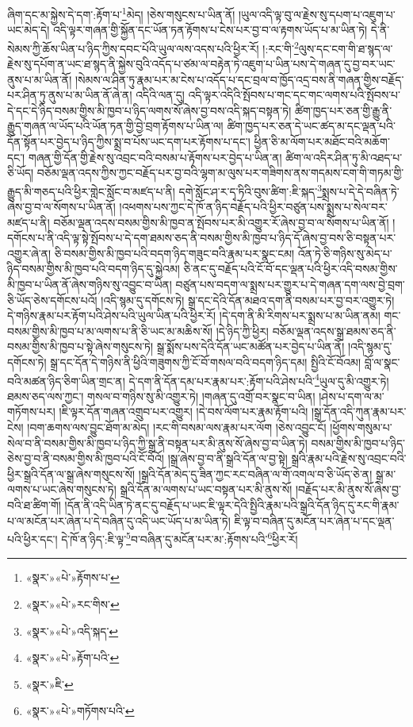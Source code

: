 ཞིག་དང་མ་སྐྱེས་དེ་དག་:རྟོག་པ་\footnote{«སྣར་»«པེ་»རྟོགས་པ་}མེད། །ཅེས་གསུངས་པ་ཡིན་ནོ། །ཡུལ་འདི་ལྟ་བུ་ལ་རྗེས་སུ་དཔག་པ་འཇུག་པ་ཡང་མེད་དེ། འདི་ལྟར་གཞན་གྱི་སྐྱོན་དང་ཡོན་ཏན་རྟོགས་པ་ངེས་པར་བྱ་བ་ལ་རྟགས་ཡོད་པ་མ་ཡིན་ཏེ། དེ་ནི་སེམས་ཀྱི་ཆོས་ཡིན་པ་ཉིད་ཀྱིས་དབང་པོའི་ཡུལ་ལས་འདས་པའི་ཕྱིར་རོ། །:རང་གི་\footnote{«སྣར་»«པེ་»རང་གིས་}ལུས་དང་ངག་གི་ཐ་སྙད་ལ་རྗེས་སུ་དཔོག་ན་ཡང་ཐ་སྙད་ནི་སྐྱེས་བུའི་འདོད་པ་ཙམ་ལ་བརྟེན་ཏེ་འཇུག་པ་ཡིན་པས་དེ་གཞན་དུ་བྱ་བར་ཡང་ནུས་པ་མ་ཡིན་ནོ། །སེམས་ལ་ཤིན་ཏུ་རྣམ་པར་མ་ངེས་པ་འདོད་པ་དང་བྲལ་བ་ཁྱོད་འདྲ་བས་ནི་གཞན་གྱིས་བརྗོད་པར་ཤིན་ཏུ་ནུས་པ་མ་ཡིན་ནོ་ཞེ་ན། འདིའི་ལན་དུ། འདི་ལྟར་འདིའི་སྤོབས་པ་གང་དང་གང་ལགས་པའི་སྤོབས་པ་དེ་དང་དེ་ཉིད་བསམ་གྱིས་མི་ཁྱབ་པ་ཉིད་ལགས་སོ་ཞེས་བྱ་བས་འདི་སྐད་བསྟན་ཏེ། ཚིག་ཁྱད་པར་ཅན་གྱི་རྒྱུ་ནི་རྒྱུད་གཞན་ལ་ཡོད་པའི་ཡོན་ཏན་གྱི་བྱེ་བྲག་རྟོགས་པ་ཡིན་ལ། ཚིག་ཁྱད་པར་ཅན་དེ་ཡང་ཚད་མ་དང་ལྡན་པའི་དོན་སྟོན་པར་བྱེད་པ་ཉིད་ཀྱིས་སྨྲ་བ་པོས་ཡང་དག་པར་རྟོགས་པ་དང་། ཕྱིན་ཅི་མ་ལོག་པར་མཐོང་བའི་མཆོག་དང་། གཞན་གྱི་དོན་གྱི་རྗེས་སུ་འབྲང་བའི་བསམ་པ་རྟོགས་པར་བྱེད་པ་ཡིན་ན། ཚིག་ལ་འདིར་ཤིན་ཏུ་མི་འཐད་པ་ཅི་ཡོད། བཅོམ་ལྡན་འདས་ཀྱིས་ཀྱང་བརྗོད་པར་བྱ་བའི་ལྷག་མ་ལུས་པར་གཟིགས་ནས་གདམས་ངག་གི་གཏམ་གྱི་རྒྱུད་མི་གཅད་པའི་ཕྱིར་གླེང་སློང་བ་མཛད་པ་ནི། དགེ་སློང་ཤ་ར་དྭ་ཏིའི་བུས་ཚིག་:ཇི་སྐད་\footnote{«སྣར་»«པེ་»འདི་སྐད་}སྨྲས་པ་དེ་དེ་བཞིན་ཏེ་ཞེས་བྱ་བ་ལ་སོགས་པ་ཡིན་ནོ། །འཕགས་པས་ཀྱང་དེ་ཁོ་ན་ཉིད་བརྗོད་པའི་ཕྱིར་བཙུན་པས་སྨྲས་པ་སེལ་བར་མཛད་པ་ནི། བཅོམ་ལྡན་འདས་བསམ་གྱིས་མི་ཁྱབ་ན་སྤོབས་པར་མི་འགྱུར་རོ་ཞེས་བྱ་བ་ལ་སོགས་པ་ཡིན་ནོ། །དགོངས་པ་ནི་འདི་ལྟ་སྟེ་སྤོབས་པ་དེ་དག་ཐམས་ཅད་ནི་བསམ་གྱིས་མི་ཁྱབ་པ་ཉིད་དོ་ཞེས་བྱ་བས་ཅི་བསྟན་པར་འགྱུར་ཞེ་ན། ཅི་བསམ་གྱིས་མི་ཁྱབ་པའི་བདག་ཉིད་གཟུང་བའི་རྣམ་པར་སྣང་ངམ། འོན་ཏེ་ཅི་གཉིས་སུ་མེད་པ་ཉིད་བསམ་གྱིས་མི་ཁྱབ་པའི་བདག་ཉིད་དུ་སྐྱེའམ། ཅི་ནང་དུ་བརྗོད་པའི་ངོ་བོ་དང་ལྡན་པའི་ཕྱིར་འདི་བསམ་གྱིས་མི་ཁྱབ་པ་ཡིན་ནོ་ཞེས་གཉིས་སུ་འབྱུང་བ་ཡིན། བཙུན་པས་བདག་ལ་སྨྲས་པར་གྱུར་པ་དེ་གཞན་དག་ལས་བྱེ་བྲག་ཅི་ཡོད་ཅེས་དགོངས་པའོ། །འདི་སྙམ་དུ་དགོངས་ཏེ། སྒྲ་དང་དེའི་དོན་མཐའ་དག་ནི་བསམ་པར་བྱ་བར་འགྱུར་ཏེ། དེ་གཉིས་རྣམ་པར་རྟོག་པའི་ཤེས་པའི་ཡུལ་ཡིན་པའི་ཕྱིར་རོ། །དེ་དག་ནི་མི་རིགས་པར་སྨྲས་པ་མ་ཡིན་ནམ། གང་བསམ་གྱིས་མི་ཁྱབ་པ་མ་ལགས་པ་ནི་ཅི་ཡང་མ་མཆིས་སོ། །དེ་ཉིད་ཀྱི་ཕྱིར། བཅོམ་ལྡན་འདས་སྒྲ་ཐམས་ཅད་ནི་བསམ་གྱིས་མི་ཁྱབ་པ་སྟེ་ཞེས་གསུངས་ཏེ། སྒྲ་སྨོས་པས་དེའི་དོན་ཡང་མཚོན་པར་བྱེད་པ་ཡིན་ནོ། །འདི་སྙམ་དུ་དགོངས་ཏེ། སྒྲ་དང་དོན་དེ་གཉིས་ནི་ཕྱིའི་གཟུགས་ཀྱི་ངོ་བོ་གསལ་བའི་བདག་ཉིད་དམ། སྤྱིའི་ངོ་བོའམ། བློ་ལ་སྣང་བའི་མཚན་ཉིད་ཅིག་ཡིན་གྲང་ན། དེ་དག་ནི་དོན་དམ་པར་རྣམ་པར་:རྟོག་པའི་ཤེས་པའི་\footnote{«སྣར་»«པེ་»རྟོག་པའི་}ཡུལ་དུ་མི་འགྱུར་ཏེ། ཐམས་ཅད་ལས་ཀྱང་། གསལ་བ་གཉིས་སུ་མི་འགྱུར་ཏེ། །གཞན་དུ་འགྲོ་བར་སྣང་བ་ཡིན། །ཤེས་པ་དག་ལ་མ་གཏོགས་པར། །ཇི་ལྟར་དོན་གཞན་འགྲུབ་པར་འགྱུར། །དེ་བས་ལོག་པར་རྣམ་རྟོག་པའི། །སྒྲ་དོན་འདི་ཀུན་རྣམ་པར་ངེས། །བག་ཆགས་ལས་བྱུང་ཐོག་མ་མེད། །རང་གི་བསམ་ལས་རྣམ་པར་ལོག །ཅེས་འབྱུང་ངོ། །ཕྱོགས་གསུམ་པ་སེལ་བ་ནི་བསམ་གྱིས་མི་ཁྱབ་པ་ཉིད་ཀྱི་སྒྲ་ནི་བསྟན་པར་མི་ནུས་སོ་ཞེས་བྱ་བ་ཡིན་ཏེ། བསམ་གྱིས་མི་ཁྱབ་པ་ཉིད་ཅེས་བྱ་བ་ནི་བསམ་གྱིས་མི་ཁྱབ་པའི་ངོ་བོའོ། །སྒྲ་ཞེས་བྱ་བ་ནི་སྒྲའི་དོན་ལ་བྱ་སྟེ། སྒྲའི་རྣམ་པའི་རྗེས་སུ་འབྲང་བའི་ཕྱིར་སྒྲའི་དོན་ལ་སྒྲ་ཞེས་གསུངས་སོ། །སྒྲའི་དོན་མེད་དུ་ཟིན་ཀྱང་རང་བཞིན་ལ་གོ་འགལ་བ་ཅི་ཡོད་ཅེ་ན། སྒྲ་མ་ལགས་པ་ཡང་ཞེས་གསུངས་ཏེ། སྒྲའི་དོན་མ་ལགས་པ་ཡང་བསྟན་པར་མི་ནུས་སོ། །བརྗོད་པར་མི་ནུས་སོ་ཞེས་བྱ་བའི་ཐ་ཚིག་གོ། །དོན་ནི་འདི་ཡིན་ཏེ་ནང་དུ་བརྗོད་པ་ཡང་ཇི་ལྟར་དེའི་སྤྱིའི་རྣམ་པའི་སྒྲའི་དོན་ཉིད་དུ་རང་གི་རྣམ་པ་ལ་མངོན་པར་ཞེན་པ་དེ་བཞིན་དུ་འདི་ཡང་ཡོད་པ་མ་ཡིན་ཏེ། ཇི་ལྟ་བ་བཞིན་དུ་མངོན་པར་ཞེན་པ་དང་ལྡན་པའི་ཕྱིར་དང་། དེ་ཁོ་ན་ཉིད་:ཇི་ལྟ་\footnote{«སྣར་»ཇི་}བ་བཞིན་དུ་མངོན་པར་མ་:རྟོགས་པའི་\footnote{«སྣར་»«པེ་»གཏོགས་པའི་}ཕྱིར་རོ། 
